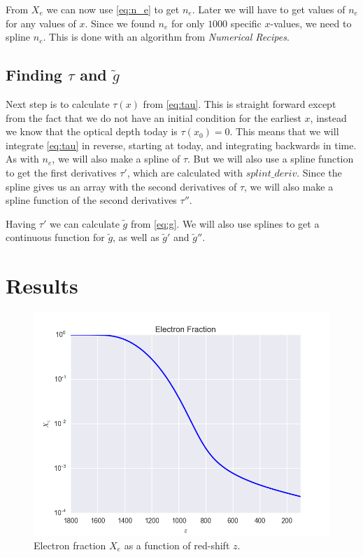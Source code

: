 \documentclass[a4paper,norsk, 10pt]{article}
\begin{document}
From $X_e$ we can now use \eqref{eq:n_e} to get $n_e$. Later we will have to get values of $n_e$ for any values of $x$. Since we found $n_e$ for only $1000$ specific $x$-values, we need to spline $n_e$. This is done with an algorithm from \textit{Numerical Recipes}. 

\subsection{Finding $\tau$ and $\tilde{g}$}

Next step is to calculate $\tau (x)$ from \eqref{eq:tau}. This is straight forward except from the fact that we do not have an initial condition for the earliest $x$, instead we know that the optical depth today is $\tau(x_0) = 0$. This means that we will integrate \eqref{eq:tau} in reverse, starting at today, and integrating backwards in time. As with $n_e$, we will also make a spline of $\tau$. But we will also use a spline function to get the first derivatives $\tau'$, which are calculated with $splint\_deriv$. Since the spline gives us an array with the second derivatives of $\tau$, we will also make a spline function of the second derivatives $\tau''$.

Having $\tau'$ we can calculate $\tilde{g}$ from \eqref{eq:g}. We will also use splines to get a continuous function for $\tilde{g}$, as well as $\tilde{g}'$ and $\tilde{g}''$.

\section{Results}

\begin{figure}[!htb]
\centering
\includegraphics[scale=0.5]{xe.png}
\caption{Electron fraction $X_e$ as a function of red-shift $z$.}\label{fig:xe}
\end{figure}
\end{document}
